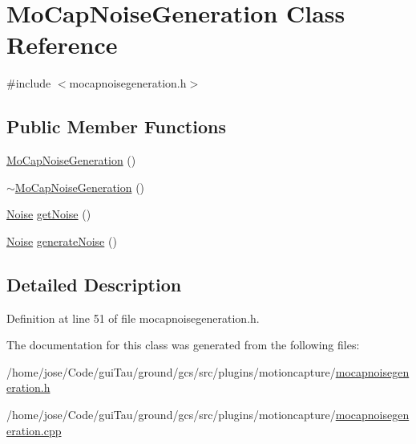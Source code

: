 \hypertarget{class_mo_cap_noise_generation}{\section{Mo\-Cap\-Noise\-Generation Class Reference}
\label{class_mo_cap_noise_generation}
}


{\ttfamily \#include $<$mocapnoisegeneration.\-h$>$}

\subsection*{Public Member Functions}
\begin{DoxyCompactItemize}
\item 
\hyperlink{group__mocapplugin_ga8157e4474b5a83adb73bbf40aa9f5fe6}{Mo\-Cap\-Noise\-Generation} ()
\item 
\hyperlink{group__mocapplugin_ga8881b0089bfba1918a16456398fabb55}{$\sim$\-Mo\-Cap\-Noise\-Generation} ()
\item 
\hyperlink{struct_noise}{Noise} \hyperlink{group__mocapplugin_ga0fe5a906dcd6c5d3dd92267217fdb9ef}{get\-Noise} ()
\item 
\hyperlink{struct_noise}{Noise} \hyperlink{group__mocapplugin_gab39e02794679a919f0d20b1901ec28c4}{generate\-Noise} ()
\end{DoxyCompactItemize}


\subsection{Detailed Description}


Definition at line 51 of file mocapnoisegeneration.\-h.



The documentation for this class was generated from the following files\-:\begin{DoxyCompactItemize}
\item 
/home/jose/\-Code/gui\-Tau/ground/gcs/src/plugins/motioncapture/\hyperlink{mocapnoisegeneration_8h}{mocapnoisegeneration.\-h}\item 
/home/jose/\-Code/gui\-Tau/ground/gcs/src/plugins/motioncapture/\hyperlink{mocapnoisegeneration_8cpp}{mocapnoisegeneration.\-cpp}\end{DoxyCompactItemize}
